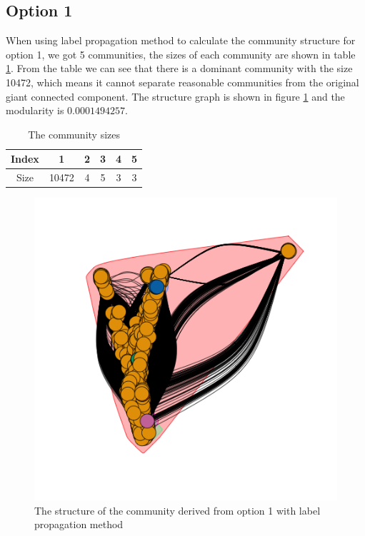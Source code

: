 \documentclass{article}
\begin{document}
\subsection{Option 1}
When using label propagation method to calculate the community structure for option 1, we got 5 communities, the sizes of each community are shown in table \ref{tb:p3_comsize}. From the table we can see that there is a dominant community with the size 10472, which means it cannot separate reasonable communities from the original giant connected component. The structure graph is shown in figure \ref{fig:lpc_opt1} and the modularity is $0.0001494257$.
\begin {table}[htbp]
\caption{The community sizes}
\begin{adjustbox}{center}
\label{tb:p3_comsize}
\begin{tabular}{|c|c|c|c|c|c|}
\hline
Index&1&2&3&4&5\\
\hline
Size&10472&4&5&3&3\\
\hline
\end{tabular}
\end{adjustbox}
\end{table}

\begin{figure}[htbp]
\centering
\captionsetup{justification=centering,margin=2cm}
\includegraphics[width=.6\textwidth]{lpc_opt1.png}
\caption{The structure of the community derived from option 1 with label propagation method}
\label{fig:lpc_opt1}
\end{figure}
\end{document}
